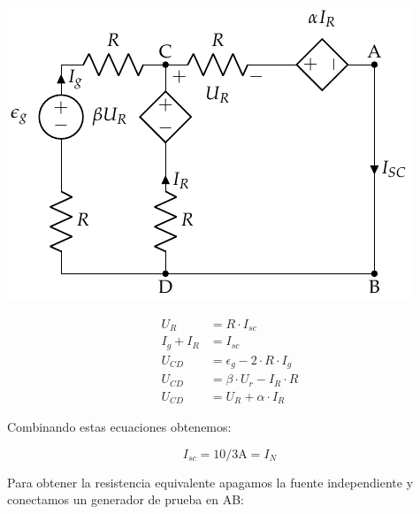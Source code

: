 \begin{minipage}{0.5\linewidth}
  \includegraphics[width=.9\linewidth]{figuras/norton_corto.pdf}
\end{minipage}
\begin{minipage}{0.5\linewidth}
  \begin{align*}
    U_R &= R \cdot I_{sc}\\
    I_g+ I_R &= I_{sc}\\
    U_{CD} &= \epsilon_g - 2 \cdot R \cdot I_g\\
    U_{CD} &= \beta \cdot U_r - I_R \cdot R\\
    U_{CD} &= U_R + \alpha \cdot I_R
  \end{align*}
\end{minipage}

Combinando estas ecuaciones obtenemos:

\begin{equation*}
  I_{sc} = 10/3\si{\ampere} = I_N
\end{equation*}

Para obtener la resistencia equivalente apagamos la fuente independiente y conectamos un generador de prueba en AB:


